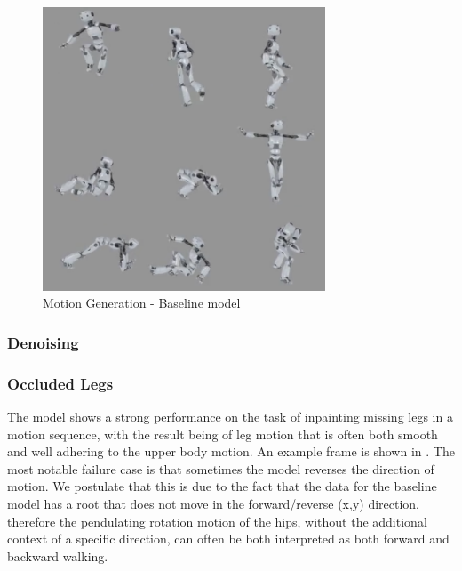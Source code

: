 \begin{figure}[!ht]
    \centering
    \includegraphics[width=0.75\textwidth]{Figures/diffusion/results/baseline_generation.png}
    \caption{Motion Generation - Baseline model}
    \label{fig:baseline_generation}
\end{figure}

\subsubsection{Denoising}

\subsubsection{Occluded Legs}
The model shows a strong performance on the task of inpainting missing legs in a motion sequence, with the result being of leg motion that is often both smooth and well adhering to the upper body motion. An example frame is shown in . 
The most notable failure case is that sometimes the model reverses the direction of motion. We postulate that this is due to the fact that the data for the baseline model has a root that does not move in the forward/reverse (x,y) direction, therefore the pendulating rotation motion of the hips, without the additional context of a specific direction, can often be both interpreted as both forward and backward walking.

